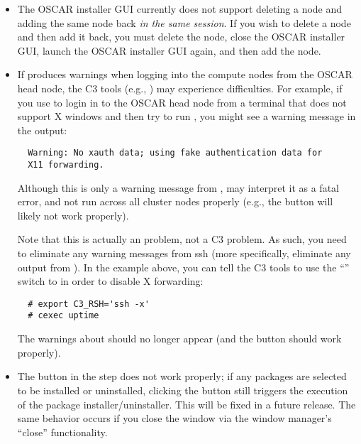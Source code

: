 \begin{itemize}
\item The OSCAR installer GUI currently does not support deleting a
  node and adding the same node back {\em in the same session}.  If
  you wish to delete a node and then add it back, you must delete the
  node, close the OSCAR installer GUI, launch the OSCAR installer GUI
  again, and then add the node.

\item If  produces warnings when logging into the compute
  nodes from the OSCAR head node, the C3 tools (e.g., ) may
  experience difficulties.  For example, if you use  to login
  in to the OSCAR head node from a terminal that does not support X
  windows and then try to run , you might see a warning
  message in the  output:

\begin{verbatim}
  Warning: No xauth data; using fake authentication data for
  X11 forwarding.
\end{verbatim}

  Although this is only a warning message from , 
  may interpret it as a fatal error, and not run across all cluster
  nodes properly (e.g., the  button
  will likely not work properly).

  Note that this is actually an  problem, not a C3 problem.
  As such, you need to eliminate any warning messages from ssh (more
  specifically, eliminate any output from ).  In the
  example above, you can tell the C3 tools to use the ``''
  switch to  in order to disable X forwarding:

\begin{verbatim}
  # export C3_RSH='ssh -x'
  # cexec uptime
\end{verbatim}

  The warnings about  should no longer appear (and the
   button should work properly).

\item The  button in the  step does not work properly; if any packages are selected
  to be installed or uninstalled, clicking the  button
  still triggers the execution of the package installer/uninstaller.
  This will be fixed in a future release.  The same behavior occurs if
  you close the window via the window manager's ``close''
  functionality.


\end{itemize}

